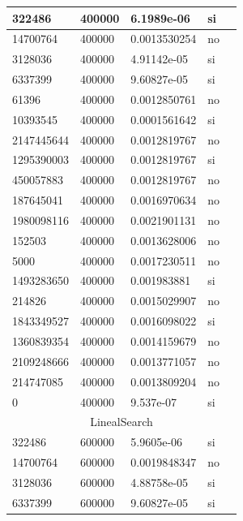 \documentclass[12pt, fleqn]{article}                             %
\theoremstyle{break}                                            %
\begin{document}
\begin{longtable}{|m{5em}|m{5em}|m{10em}|m{5em}|@{}m{0pt}@{}}
            322486& 400000  & 6.1989e-06 & si &\\[1em]    \hline
            14700764& 400000  & 0.0013530254 & no &\\[1em]    \hline
            3128036& 400000  & 4.91142e-05 & si &\\[1em]    \hline
            6337399& 400000  & 9.60827e-05 & si &\\[1em]    \hline
            61396& 400000  & 0.0012850761 & no &\\[1em]    \hline
            10393545& 400000  & 0.0001561642 & si &\\[1em]    \hline
            2147445644& 400000  & 0.0012819767 & no &\\[1em]    \hline
            1295390003& 400000  & 0.0012819767 & si &\\[1em]    \hline
            450057883& 400000  & 0.0012819767 & no &\\[1em]    \hline
            187645041& 400000  & 0.0016970634 & no &\\[1em]    \hline
            1980098116& 400000  & 0.0021901131 & no &\\[1em]    \hline
            152503& 400000  & 0.0013628006 & no &\\[1em]    \hline
            5000& 400000  & 0.0017230511 & no &\\[1em]    \hline
            1493283650& 400000  & 0.001983881 & si &\\[1em]    \hline
            214826& 400000  & 0.0015029907 & no &\\[1em]    \hline
            1843349527& 400000  & 0.0016098022 & si &\\[1em]    \hline
            1360839354& 400000  & 0.0014159679 & no &\\[1em]    \hline
            2109248666& 400000  & 0.0013771057 & no &\\[1em]    \hline
            214747085& 400000  & 0.0013809204 & no &\\[1em]    \hline
            0& 400000  & 9.537e-07 & si &\\[1em]    \hline
            \multicolumn{5}{|c|}{LinealSearch}   \\          \hline
            322486& 600000  & 5.9605e-06 & si &\\[1em]    \hline
            14700764& 600000  & 0.0019848347 & no &\\[1em]    \hline
            3128036& 600000  & 4.88758e-05 & si &\\[1em]    \hline
            6337399& 600000  & 9.60827e-05 & si &\\[1em]    \hline

\end{longtable}
\end{document}
